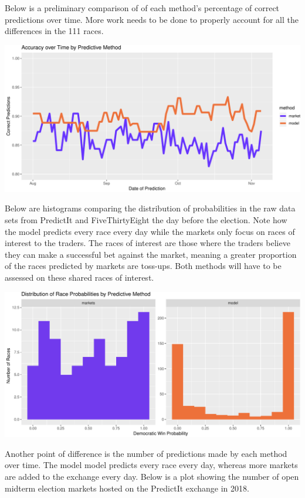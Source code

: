 \documentclass[]{article}
\begin{document}
Below is a preliminary comparison of of each method's percentage of
correct predictions over time. More work needs to be done to properly
account for all the differences in the 111 races.

\includegraphics{progress_report_files/figure-latex/p2_plot-1.pdf}

Below are histograms comparing the distribution of probabilities in the
raw data sets from PredictIt and FiveThirtyEight the day before the
election. Note how the model predicts every race every day while the
markets only focus on races of interest to the traders. The races of
interest are those where the traders believe they can make a successful
bet against the market, meaning a greater proportion of the races
predicted by markets are toss-ups. Both methods will have to be assessed
on these shared races of interest.

\includegraphics{progress_report_files/figure-latex/plot_races_hist-1.pdf}

Another point of difference is the number of predictions made by each
method over time. The model model predicts every race every day, whereas
more markets are added to the exchange every day. Below is a plot
showing the number of open midterm election markets hosted on the
PredictIt exchange in 2018.
\end{document}
